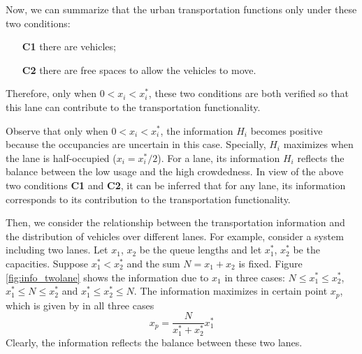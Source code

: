 \documentclass[preprint,authoryear,12pt]{elsarticle}
\begin{document}
Now, we can summarize that the urban transportation functions only under these two conditions:
\begin{enumerate}
  \item[\textbf{C1}] there are vehicles; \label{list:c1}
  \item[\textbf{C2}] there are free spaces to allow the vehicles to move. \label{list:c2}
\end{enumerate}
Therefore, only when $0<x_i<x_i^*$, these two conditions are both verified so that this lane can contribute to the transportation functionality.

Observe that only when $0<x_i<x_i^*$, the information $H_i$ becomes positive because the occupancies are uncertain in this case. Specially, $H_i$ maximizes when the lane is half-occupied ($x_i=x_i^*/2$). For a lane, its information $H_i$ reflects the balance between the low usage and the high crowdedness. In view of the above two conditions \textbf{C1} and \textbf{C2}, it can be inferred that for any lane, its information corresponds to its contribution to the transportation functionality.

Then, we consider the relationship between the transportation information and the distribution of vehicles over different lanes. For example, consider a system including two lanes. Let $x_1$, $x_2$ be the queue lengths and let $x_1^*$, $x_2^*$ be the capacities. Suppose $x_1^*<x_2^*$ and the sum $N=x_1+x_2$ is fixed. Figure \ref{fig:info_twolane} shows the information due to $x_1$ in three cases: $N\le x^*_1\le x^*_2$, $x^*_1\le N\le x^*_2$ and $x^*_1\le x^*_2\le N$. The information maximizes in certain point $x_p$, which is given by in all three cases
$$x_p = \frac{N}{x_1^*+x_2^*} x_1^*$$
Clearly, the information reflects the balance between these two lanes.
\end{document}
